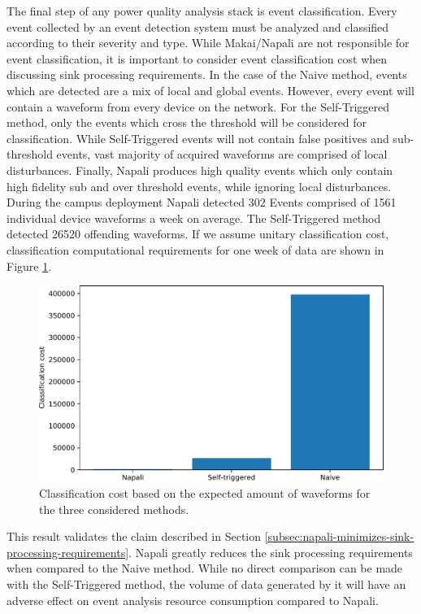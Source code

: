 The final step of any power quality analysis stack is event classification.
Every event collected by an event detection system must be analyzed and classified according to their severity and type.
While Makai/Napali are not responsible for event classification, it is important to consider event classification cost when discussing sink processing requirements.
In the case of the Naive method, events which are detected are a mix of local and global events.
However, every event will contain a waveform from every device on the network.
For the Self-Triggered method, only the events which cross the threshold will be considered for classification.
While Self-Triggered events will not contain false positives and sub-threshold events, vast majority of acquired waveforms are comprised of local disturbances.
Finally, Napali produces high quality events which only contain high fidelity sub and over threshold events, while ignoring local disturbances.
During the campus deployment Napali detected 302 Events comprised of 1561 individual device waveforms a week on average.
The Self-Triggered method detected 26520 offending waveforms.
If we assume unitary classification cost, classification computational requirements for one week of data are shown in Figure \ref{expdes:fig:classification}.
\begin{figure}[ht!]
    \centering
    \includegraphics[width=0.8\linewidth]{img/napali_eval/classification_cost.pdf}
    \caption{Classification cost based on the expected amount of waveforms for the three considered methods.}
    \label{expdes:fig:classification}
\end{figure}

This result validates the claim described in Section \ref{subsec:napali-minimizes-sink-processing-requirements}.
Napali greatly reduces the sink processing requirements when compared to the Naive method.
While no direct comparison can be made with the Self-Triggered method, the volume of data generated by it will have an adverse effect on event analysis resource consumption compared to Napali.


